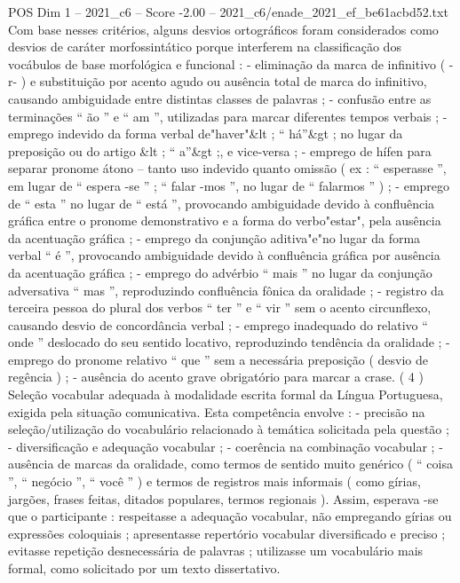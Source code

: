 \begin{textsample}{POS Dim 1 – 2021\_c6 – Score -2.00 – 2021\_c6/enade\_2021\_ef\_be61acbd52.txt}
Com base nesses critérios, alguns desvios ortográficos foram considerados como desvios de caráter morfossintático porque interferem na classificação dos vocábulos de base morfológica e funcional : - eliminação da marca de infinitivo ( -r- ) e substituição por acento agudo ou ausência total de marca do infinitivo, causando ambiguidade entre distintas classes de palavras ; - confusão entre as terminações “ ão ” e “ am ”, utilizadas para marcar diferentes tempos verbais ; - emprego indevido da forma verbal de"haver"\&lt ; “ há”\&gt ; no lugar da preposição ou do artigo \&lt ; “ a”\&gt ;, e vice-versa ; - emprego de hífen para separar pronome átono – tanto uso indevido quanto omissão ( ex : “ esperasse ”, em lugar de “ espera -se ” ; “ falar -mos ”, no lugar de “ falarmos ” ) ; - emprego de “ esta ” no lugar de “ está ”, provocando ambiguidade devido à confluência gráfica entre o pronome demonstrativo e a forma do verbo"estar", pela ausência da acentuação gráfica ; - emprego da conjunção aditiva"e"no lugar da forma verbal “ é ”, provocando ambiguidade devido à confluência gráfica por ausência da acentuação gráfica ; - emprego do advérbio “ mais ” no lugar da conjunção adversativa “ mas ”, reproduzindo confluência fônica da oralidade ; - registro da terceira pessoa do plural dos verbos “ ter ” e “ vir ” sem o acento circunflexo, causando desvio de concordância verbal ; - emprego inadequado do relativo “ onde ” deslocado do seu sentido locativo, reproduzindo tendência da oralidade ; - emprego do pronome relativo “ que ” sem a necessária preposição ( desvio de regência ) ; - ausência do acento grave obrigatório para marcar a crase. ( 4 ) Seleção vocabular adequada à modalidade escrita formal da Língua Portuguesa, exigida pela situação comunicativa.
Esta competência envolve : - precisão na seleção/utilização do vocabulário relacionado à temática solicitada pela questão ; - diversificação e adequação vocabular ; - coerência na combinação vocabular ; - ausência de marcas da oralidade, como termos de sentido muito genérico ( “ coisa ”, “ negócio ”, “ você ” ) e termos de registros mais informais ( como gírias, jargões, frases feitas, ditados populares, termos regionais ).
Assim, esperava -se que o participante : respeitasse a adequação vocabular, não empregando gírias ou expressões coloquiais ; apresentasse repertório vocabular diversificado e preciso ; evitasse repetição desnecessária de palavras ; utilizasse um vocabulário mais formal, como solicitado por um texto dissertativo.

\end{textsample}
